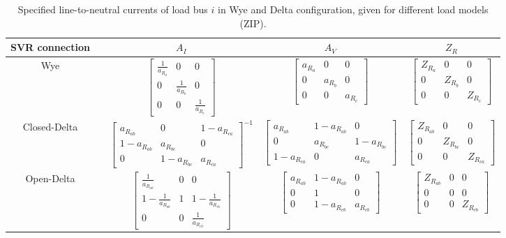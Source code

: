 \documentclass[10pt,journal]{article}
\begin{document}
 \begin{table}[h]
\renewcommand{\arraystretch}{1.1}
\centering
\caption{Specified line-to-neutral currents of load bus $i$ in Wye and Delta configuration, given for different load models (ZIP). }\label{tab:svrent}
\begin{adjustbox}{width=1\textwidth} %
\small
\begin{tabular}{ccccc}
\toprule
{\textbf{SVR  connection}} && $A_I$ & $A_V$ & $Z_R$   \\
\midrule 
Wye && $\begin{bmatrix}
\frac{1}{a_{R_a}} & 0 & 0 \\
0 & \frac{1}{a_{R_b}}  & 0 \\
0 & 0 & \frac{1}{a_{R_c}} 
\end{bmatrix}$ & $\begin{bmatrix}
a_{R_a} & 0 & 0 \\
0 & a_{R_b} & 0 \\
0 & 0 & a_{R_c}
\end{bmatrix}$ & $\begin{bmatrix}
Z_{R_a} & 0 & 0 \\
0 & Z_{R_b} & 0 \\
0 & 0 & Z_{R_c} 
\end{bmatrix}$ \\
Closed-Delta  && $\begin{bmatrix}
a_{R_{ab}} & 0 & 1-a_{R_{ca}} \\
1 - a_{R_{ab}} & a_{R_{bc}} & 0 \\
0 & 1- a_{R_{bc}}  & a_{R_{ca}}
\end{bmatrix}^{-1}$  & $\begin{bmatrix}
a_{R_{ab}} & 1-a_{R_{ab}} & 0 \\
0 & a_{R_{bc}} & 1-a_{R_{bc}} \\
1- a_{R_{ca}} & 0 & a_{R_{ca}}
\end{bmatrix}$  & $\begin{bmatrix}
Z_{R_{ab}} & 0 & 0 \\
0 & Z_{R_{bc}} & 0 \\
0 & 0 & Z_{R_{ca}} 
\end{bmatrix}$ \\
Open-Delta && $\begin{bmatrix}
\frac{1}{a_{R_{ab}}} & 0 & 0 \\
1 - \frac{1}{a_{R_{ab}}} & 1 & 1 - \frac{1}{a_{R_{cb}}}\\
0 & 0  &   \frac{1}{a_{R_{cb}}}
\end{bmatrix}$  & $\begin{bmatrix}
a_{R_{ab}} & 1-a_{R_{ab}} & 0 \\
0 & 1 & 0 \\
0 & 1- a_{R_{cb}} &  a_{R_{cb}}
\end{bmatrix}$  & $\begin{bmatrix}
Z_{R_{ab}} & 0 & 0 \\
0 & 0 & 0 \\
0 & 0 & Z_{R_{cb}} 
\end{bmatrix}$  \\


\end{tabular}
\end{adjustbox}
\end{table}
\end{document}
